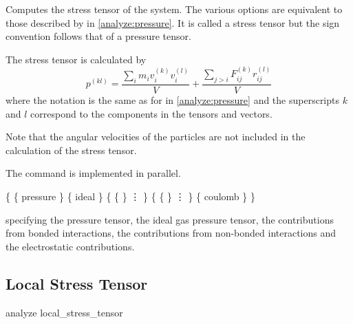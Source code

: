Computes the stress tensor of the system.  The various options are equivalent to those described by
 in \vref{analyze:pressure}. It is called a stress tensor but the sign
convention follows that of a pressure tensor.


The stress tensor is calculated by 
\begin{equation}
  p^{(kl)} = \frac{\sum_{i} {m_{i}v_{i}^{(k)}v_{i}^{(l)}}}{V} + \frac{\sum_{j>i}{F_{ij}^{(k)}r_{ij}^{(l)}}}{V}
\end{equation}
where the notation is the same as for  in \vref{analyze:pressure} and the
superscripts $k$ and $l$ correspond to the components in the tensors and vectors.  

Note that the
angular velocities of the particles are not included in the calculation of the stress tensor. 


The command is implemented in parallel.


\begin{code}
\{ \{ pressure  \}
   \{ ideal  \} 
   \{ \{   \}
      \vdots
   \}
   \{ \{   \}
      \vdots
   \}
   \{ coulomb  \}
\}
\end{code}
specifying the pressure tensor, the ideal gas pressure tensor, the
contributions from bonded interactions, the contributions from
non-bonded interactions and the electrostatic contributions.

\subsection{Local Stress Tensor}
\label{analyze:localstresstensor}

\begin{essyntax}
  analyze local_stress_tensor             
\end{essyntax}

